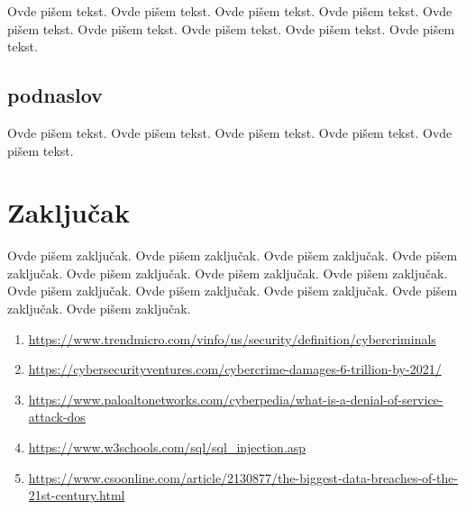 \documentclass[a4paper]{article}
\begin{document}
Ovde pišem tekst. 
Ovde pišem tekst. 
Ovde pišem tekst. 
Ovde pišem tekst. 
Ovde pišem tekst. 
Ovde pišem tekst. 
Ovde pišem tekst. 
Ovde pišem tekst. 
Ovde pišem tekst. 

\subsection{podnaslov}
\label{subsec:podnaslov}

Ovde pišem tekst. 
Ovde pišem tekst. 
Ovde pišem tekst. 
Ovde pišem tekst. 
Ovde pišem tekst.

\section{Zaključak}
\label{sec:zakljucak}

Ovde pišem zaključak. 
Ovde pišem zaključak. 
Ovde pišem zaključak. 
Ovde pišem zaključak. 
Ovde pišem zaključak. 
Ovde pišem zaključak. 
Ovde pišem zaključak. 
Ovde pišem zaključak. 
Ovde pišem zaključak. 
Ovde pišem zaključak. 
Ovde pišem zaključak. 
Ovde pišem zaključak.

 

\appendix
 

\begin{enumerate}
\item \url{https://www.trendmicro.com/vinfo/us/security/definition/cybercriminals}
\item \url{https://cybersecurityventures.com/cybercrime-damages-6-trillion-by-2021/} 
\item \url{https://www.paloaltonetworks.com/cyberpedia/what-is-a-denial-of-service-attack-dos}
\item \url{https://www.w3schools.com/sql/sql_injection.asp}
\item \url{https://www.csoonline.com/article/2130877/the-biggest-data-breaches-of-the-21st-century.html}
\end{enumerate}
\end{document}
